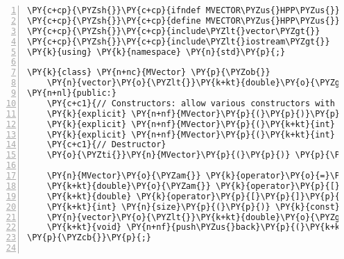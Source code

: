 \begin{Verbatim}[tabsize=2,commandchars=\\\{\},numbers=left,firstnumber=1,stepnumber=1]
\PY{c+cp}{\PYZsh{}}\PY{c+cp}{ifndef MVECTOR\PYZus{}HPP\PYZus{}}
\PY{c+cp}{\PYZsh{}}\PY{c+cp}{define MVECTOR\PYZus{}HPP\PYZus{}}
\PY{c+cp}{\PYZsh{}}\PY{c+cp}{include\PYZlt{}vector\PYZgt{}}
\PY{c+cp}{\PYZsh{}}\PY{c+cp}{include\PYZlt{}iostream\PYZgt{}}
\PY{k}{using} \PY{k}{namespace} \PY{n}{std}\PY{p}{;}

\PY{k}{class} \PY{n+nc}{MVector} \PY{p}{\PYZob{}}
	\PY{n}{vector}\PY{o}{\PYZlt{}}\PY{k+kt}{double}\PY{o}{\PYZgt{}} \PY{n}{v}\PY{p}{;}
\PY{n+nl}{public:}
	\PY{c+c1}{// Constructors: allow various constructors with different arguments}
	\PY{k}{explicit} \PY{n+nf}{MVector}\PY{p}{(}\PY{p}{)}\PY{p}{\PYZob{}}\PY{p}{\PYZcb{}}
	\PY{k}{explicit} \PY{n+nf}{MVector}\PY{p}{(}\PY{k+kt}{int} \PY{n}{n}\PY{p}{)}\PY{o}{:}\PY{n}{v}\PY{p}{(}\PY{n}{n}\PY{p}{)}\PY{p}{\PYZob{}}\PY{p}{\PYZcb{}}
	\PY{k}{explicit} \PY{n+nf}{MVector}\PY{p}{(}\PY{k+kt}{int} \PY{n}{n}\PY{p}{,} \PY{k+kt}{double} \PY{n}{x}\PY{p}{)}\PY{o}{:}\PY{n}{v}\PY{p}{(}\PY{n}{n}\PY{p}{,}\PY{n}{x}\PY{p}{)}\PY{p}{\PYZob{}}\PY{p}{\PYZcb{}}
	\PY{c+c1}{// Destructor}
	\PY{o}{\PYZti{}}\PY{n}{MVector}\PY{p}{(}\PY{p}{)} \PY{p}{\PYZob{}}\PY{p}{\PYZcb{}}	\PY{c+c1}{// Destructor does nothing here}

	\PY{n}{MVector}\PY{o}{\PYZam{}} \PY{k}{operator}\PY{o}{=}\PY{p}{(}\PY{k}{const} \PY{n}{MVector}\PY{o}{\PYZam{}} \PY{n}{X}\PY{p}{)}\PY{p}{;}
	\PY{k+kt}{double}\PY{o}{\PYZam{}} \PY{k}{operator}\PY{p}{[}\PY{p}{]}\PY{p}{(}\PY{k+kt}{int} \PY{n}{index}\PY{p}{)}\PY{p}{;}
	\PY{k+kt}{double} \PY{k}{operator}\PY{p}{[}\PY{p}{]}\PY{p}{(}\PY{k+kt}{int} \PY{n}{index}\PY{p}{)} \PY{k}{const}\PY{p}{;}
	\PY{k+kt}{int} \PY{n}{size}\PY{p}{(}\PY{p}{)} \PY{k}{const}\PY{p}{;}
	\PY{n}{vector}\PY{o}{\PYZlt{}}\PY{k+kt}{double}\PY{o}{\PYZgt{}} \PY{n}{getVector}\PY{p}{(}\PY{p}{)}\PY{p}{;}
	\PY{k+kt}{void} \PY{n+nf}{push\PYZus{}back}\PY{p}{(}\PY{k+kt}{double} \PY{n}{x}\PY{p}{)}\PY{p}{;}
\PY{p}{\PYZcb{}}\PY{p}{;}


\end{Verbatim}
